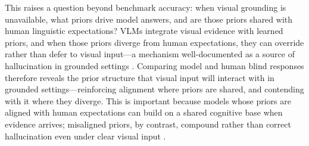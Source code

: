 \documentclass[letterpaper]{article}
\begin{document}
This raises a question beyond benchmark accuracy: when visual grounding is
unavailable, what priors drive model answers, and are those priors shared
with human linguistic expectations?
VLMs integrate visual evidence with learned priors, and when those priors diverge
from human expectations, they can override rather than defer to visual input---a
mechanism well-documented as a source of hallucination in grounded settings
\citep{ji2023survey,rohrbach2018object}.
Comparing model and human blind responses therefore reveals the prior structure
that visual input will interact with in grounded settings---reinforcing alignment
where priors are shared, and contending with it where they diverge. This is important because models whose priors are aligned with human expectations can build on a shared cognitive base when evidence arrives; misaligned priors, by contrast, compound rather than correct hallucination even under clear visual input \citep{bar2007proactive,ji2023survey}.
\end{document}

